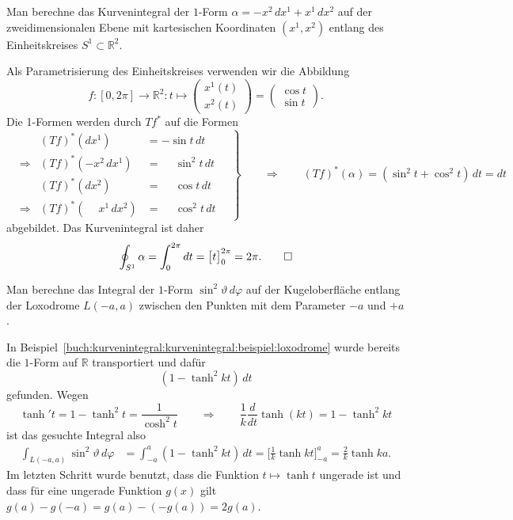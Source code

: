\begin{beispiel}
Man berechne das Kurvenintegral der $1$-Form $\alpha=-x^2\,dx^1+x^1\,dx^2$ auf
%
der zweidimensionalen Ebene mit kartesischen Koordinaten $(x^1,x^2)$
entlang des Einheitskreises $S^1\subset\mathbb{R}^2$.
%
\smallskip

\noindent
Als Parametrisierung des Einheitskreises verwenden wir die Abbildung
\[
f
\colon
[0,2\pi]
\to
\mathbb{R}^2
:
t
\mapsto
\begin{pmatrix} x^1(t)\\x^2(t)\end{pmatrix}
=
\begin{pmatrix} \cos t\\\sin t\end{pmatrix}.
\]
Die 1-Formen werden durch $Tf^*$ auf die Formen
\[
\left.
\begin{aligned}
&           &(Tf)^*(dx^1)                  &= -\sin t\,dt             \\
&\Rightarrow&(Tf)^*(-x^2\,dx^1)            &= \phantom{-}\sin^2 t\,dt \\[4pt]
&           &(Tf)^*(dx^2)                  &= \phantom{-}\cos t\,dt   \\
&\Rightarrow&(Tf)^*(\phantom{-} x^1\,dx^2) &= \phantom{-}\cos^2 t\,dt
\end{aligned}
\quad
\right\}
\qquad\Rightarrow\qquad
(Tf)^*(\alpha)
=
(\sin^2 t+\cos^2 t)\,dt
=
dt
\]
abgebildet.
Das Kurvenintegral ist daher
\[
\oint_{S^1} \alpha
=
\int_0^{2\pi} dt
=
\bigl[
t
\bigr]_0^{2\pi}
=
2\pi.
\qedhere
\]
\end{beispiel}

\begin{beispiel}
Man berechne das Integral der $1$-Form $\sin^2\vartheta\,d\varphi$ auf
der Kugeloberfläche entlang der Loxodrome $L(-a,a)$ zwischen den Punkten
mit dem Parameter $-a$ und $+a$.
\smallskip

\noindent
In Beispiel~\ref{buch:kurvenintegral:kurvenintegral:beispiel:loxodrome}
wurde bereits die $1$-Form auf $\mathbb{R}$ transportiert und dafür
\[
(1-\tanh^2 kt)\,dt
\]
gefunden.
Wegen
\[
\tanh' t
=
1-\tanh^2 t
=
\frac{1}{\cosh^2 t}
\qquad\Rightarrow\qquad
\frac{1}{k}
\frac{d}{dt}
\tanh(kt)
=
1-\tanh^2 kt
\]
ist das gesuchte Integral also
\begin{align*}
\int_{L(-a,a)} \sin^2\vartheta\,d\varphi
&=
\int_{-a}^a
(1-\tanh^2 kt)
\,dt
=
\biggl[
\frac{1}k
\tanh kt
\biggr]_{-a}^a
=\frac{2}{k} \tanh ka.
\end{align*}
Im letzten Schritt wurde benutzt, dass die Funktion $t\mapsto \tanh t$
ungerade ist und dass für eine ungerade Funktion $g(x)$ gilt
$g(a)-g(-a)= g(a)-(-g(a))=2g(a)$.
\end{beispiel}

